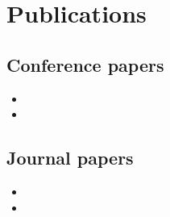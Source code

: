\chapter{Publications}
\label{chap:publications}

\begin{refsection}
	\section*{Conference papers}
	
	\begin{itemize}
		\item 	{}
		\item	{}		
	\end{itemize}
	\section*{Journal papers}
	\begin{itemize}
		\item 	{}
		\item {}
			\end{itemize}
\end{refsection}